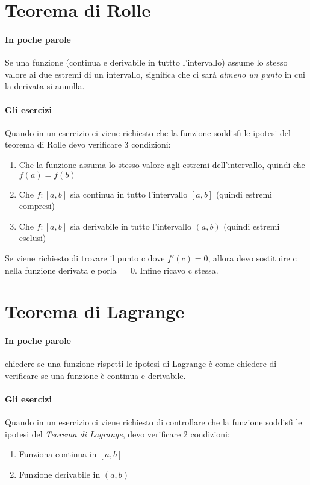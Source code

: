 \section{Teorema di Rolle}

\paragraph*{In poche parole}
Se una funzione (continua e derivabile in tuttto l'intervallo) assume lo stesso valore ai due estremi di un intervallo,
significa che ci sarà \emph{almeno un punto} in cui la derivata si annulla.

\paragraph*{Gli esercizi}
Quando in un esercizio ci viene richiesto che la funzione soddisfi le ipotesi del
teorema di Rolle devo verificare 3 condizioni:
\begin{enumerate}
	\item Che la funzione assuma lo stesso valore agli estremi dell'intervallo, quindi che $f(a) = f(b)$
	\item Che $f:[a,b]$ sia continua in tutto l'intervallo $[a,b]$ (quindi estremi compresi)
	\item Che $f:[a,b]$ sia derivabile in tutto l'intervallo $(a,b)$ (quindi estremi esclusi)
\end{enumerate}
Se viene richiesto di trovare il punto c dove $f'(c) = 0$, allora devo
sostituire c nella funzione derivata e porla $= 0$. Infine ricavo c stessa.

\section{Teorema di Lagrange}
\paragraph{In poche parole} chiedere se una funzione rispetti le ipotesi di Lagrange è come
chiedere di verificare se una funzione è continua e derivabile.

\paragraph*{Gli esercizi}
Quando in un esercizio ci viene richiesto di controllare che la funzione soddisfi le ipotesi del \emph{Teorema di Lagrange},
devo verificare 2 condizioni:
\begin{enumerate}
	\item Funziona continua in $[a,b]$
	\item Funzione derivabile in $(a,b)$
\end{enumerate}


